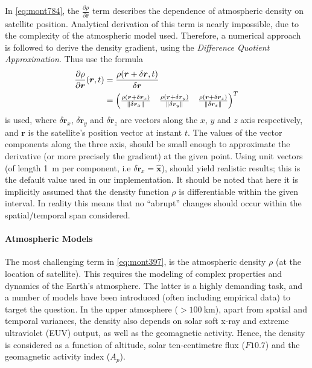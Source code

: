 In \autoref{eq:mont784}, the $\frac{\partial \rho}{\partial \bm{r}}$ term describes 
the dependence of atmospheric density on satellite position. Analytical derivation 
of this term is nearly impossible, due to the complexity of the atmospheric model 
used. Therefore, a numerical approach is followed to derive the density gradient, 
using the \emph{Difference Quotient Approximation}. Thus use the formula
\begin{equation}
  \begin{aligned}
  \frac{\partial \rho}{\partial \bm{r}}(\bm{r},t) 
    &= 
      \frac{\rho (\bm{r}+\delta \bm{r}, t)}{\delta \bm{r}} \\
    &= \begin{pmatrix}
      \frac{\rho (\bm{r}+\delta \bm{r}_x)}{\lVert\delta \bm{r}_x\rVert} &
      \frac{\rho (\bm{r}+\delta \bm{r}_y)}{\lVert\delta \bm{r}_y\rVert} &
      \frac{\rho (\bm{r}+\delta \bm{r}_z)}{\lVert\delta \bm{r}_z\rVert} 
    \end{pmatrix}^T
  \end{aligned}
\end{equation}
is used, where $\delta \bm{r}_x$, $\delta \bm{r}_y$ and $\delta \bm{r}_z$ are vectors along 
the $x$, $y$ and $z$ axis respectively, and $\bm{r}$ is the satellite's position 
vector at instant $t$. The values of the vector components along the three axis, 
should be small enough to approximate the derivative (or more precisely the gradient) 
at the given point. Using unit vectors (of length \SI{1}{\meter} per component, i.e 
$\delta \bm{r}_x = \hat{\bm{x}}$), should yield realistic results; this is the 
default value used in our implementation. It should be noted that here it is 
implicitly assumed that the density function $\rho$ is differentiable within the 
given interval. In reality this means that no ``abrupt'' changes should occur within 
the spatial/temporal span considered.

\paragraph{Atmospheric Models}\label{par:atmospheric-models}
The most challenging term in \autoref{eq:mont397}, is the atmospheric density $\rho$ 
(at the location of satellite). This requires the modeling of complex properties 
and dynamics of the Earth's atmosphere. The latter is a highly demanding task, and 
a number of models have been introduced (often including empirical data) to 
target the question. In the upper atmosphere ($>\SI{100}{\km}$), apart from spatial 
and temporal variances, the density also depends on solar soft x-ray and extreme 
ultraviolet (EUV) output, as well as the geomagnetic activity. Hence, the density is 
considered as a function of altitude, solar ten-centimetre flux ($F10.7$) and the 
geomagnetic activity index ($A_p$). 

